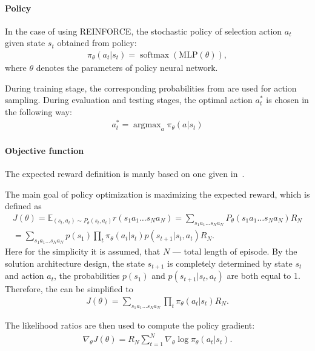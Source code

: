 \documentclass{article}
\begin{document}
\paragraph{Policy}
In the case of using REINFORCE, the stochastic policy of selection action $a_t$
given state $s_t$ obtained from policy:
\begin{align}
  \label{eq:rnf_policy}
  \pi_{\theta}(a_t | s_t) =
  \operatorname{softmax}(\text{MLP}(\theta)),
\end{align}
where $\theta$ denotes the parameters of policy neural network.

During training stage, the corresponding probabilities from
 are used for action sampling. During evaluation and
testing stages, the optimal action $a_t^\ast$ is chosen in the following way:
\begin{align}
  \label{eq:rnf_optimal}
  a_t^\ast = \operatorname{argmax}_{a}\pi_{\theta}(a | s_t)
\end{align}

\paragraph{Objective function}
The expected reward definition is manly based on one given in~\cite{Zhang2018}.

The main goal of policy optimization is maximizing the expected reward, which
is defined as
\begin{multline}\label{eq:rnf_expreward}
  J(\theta) = \mathbb{E}_{(s_t, a_t) \sim P_{\theta}(s_t, a_t)} r(s_1 a_1 \dots s_N
  a_N) = \sum_{s_1 a_1 \dots s_N a_N} P_{\theta}(s_1 a_1 \dots s_N a_N)R_N \\ =
  \sum_{s_1 a_1 \dots s_N a_N} p(s_1) \prod_t \pi_{\theta}(a_t | s_t)p(s_{t+1}|
  s_t, a_t)R_N.
\end{multline}
Here for the simplicity it is assumed,
that $N$ --- total length of episode.
By the solution architecture design, the state $s_{t+1}$ is completely
determined by state $s_t$ and action $a_t$, the probabilities
$p(s_1)$ and $p(s_{t+1}|s_t, a_t)$ are both equal to 1. Therefore,
the  can be simplified to
\begin{align}
  J(\theta) = \sum_{s_1 a_1 \dots s_N a_N}\prod_t \pi_{\theta}(a_t | s_t)R_N.
\end{align}

The likelihood ratios are then used to compute the policy gradient:
\begin{align}
  \label{eq:rnf_pg}
  \nabla_{\theta} J(\theta) = R_N \sum_{t=1}^N \nabla_{\theta} \log \pi_{\theta}(a_t | s_t).
\end{align}
\end{document}
